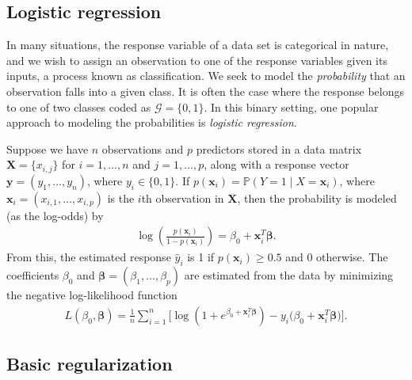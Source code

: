 \documentclass[11pt]{article}
\begin{document}
\subsection{Logistic regression}

In many situations, the response variable of a data set is categorical in nature, and we wish to assign an observation to one of the response variables given its inputs, a process known as classification. We seek to model the \textit{probability} that an observation falls into a given class. It is often the case where the response belongs to one of two classes coded as $\mathcal{G} = \{ 0,1 \}$. In this binary setting, one popular approach to modeling the probabilities is \textit{logistic regression}.

Suppose we have $n$ observations and $p$ predictors stored in a data matrix $\mathbf{X} = \{ x_{i,j} \}$ for $i = 1, \ldots, n$ and $j = 1, \ldots, p$, along with a response vector $\mathbf{y} = (y_1, \ldots, y_n)$, where $y_i \in \{ 0,1 \}$. If $p(\bm{x}_i) = \mathbb{P}(Y = 1 \mid X = \bm{x}_i)$, where $\bm{x}_i = (x_{i,1}, \ldots, x_{i,p})$ is the $i$th observation in $\mathbf{X}$,
then the probability is modeled (as the log-odds) by
\begin{align}
    \label{logprob}
    \log \left( \frac{p(\bm{x}_i)}{1 - p(\bm{x}_i)} \right) = \beta_0 + \bm{x}_i^T \bm{\beta}.
\end{align}
From this, the estimated response $\hat{y}_i$ is 1 if $p(\bm{x}_i) \ge 0.5$ and 0 otherwise. The coefficients $\beta_0$ and $\bm{\beta} = (\beta_1, \ldots, \beta_p)$ are estimated from the data by minimizing the negative log-likelihood function
\begin{align}
\label{negloglike}
    L (\beta_0, \bm{\beta}) = \frac{1}{n} \sum_{i = 1}^n \Big[ \log \left(1 + e^{\beta_0 + \bm{x}_i^T \bm{\beta}}  \right)  - y_i \big(\beta_0 + \bm{x}_i^T \bm{\beta} \big)\Big].
\end{align}

\subsection{Basic regularization}
\end{document}
